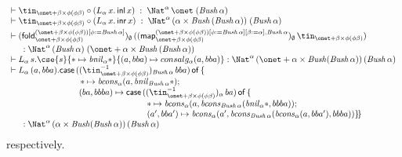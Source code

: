 \documentclass{lmcs}
\theoremstyle{plain}\newtheorem{satz}[thm]{Satz}
\newcommand{\inl}{\mathsf{inl}}
\newcommand{\inr}{\mathsf{inr}}
\newcommand{\fold}{\mathsf{fold}}
\newcommand{\ininv}[2]{(\tin^{-1}_{\onet +
  \beta \times \phi (\phi\beta)})_{#1}\, #2}
\newcommand{\map}{\mathsf{map}}
\begin{document}
\[\begin{array}{l}
\vdash \tin_{\onet + \beta \times \phi (\phi\beta)} \circ (
L_{\alpha}\, x.\, \inl\, x) \; : \; \Nat^{\alpha}\, \onet\;
(\mathit{Bush}\,\alpha)\\ 
\vdash \tin_{\onet + \beta \times \phi (\phi\beta)} \circ (
L_{\alpha}\, x.\, \inr\, x ) \; : \; \Nat^{\alpha}\, (\alpha \times
\mathit{Bush}\,(\mathit{Bush}\,\alpha))\; (\mathit{Bush}\,\alpha)\\[0.05in]
\vdash (\fold_{\onet + \beta \times \phi (\phi\beta)}^{(\onet + \beta
  \times \phi (\phi\beta))[\phi := \mathit{Bush}\,\alpha]})_\emptyset\,
((\map_{\onet + \beta \times \phi (\phi\beta)}^{(\onet + \beta \times
  \phi (\phi\beta))[\phi := \mathit{Bush}\,\alpha][\beta := \alpha],
  \mathit{Bush}\,\alpha})_\emptyset\, \tin_{\onet + \beta \times \phi
  (\phi\beta)})\\[0.05in]
\hspace*{0.2in} : \Nat^{\alpha}\, (\mathit{Bush}\,\alpha)\; (\onet +
\alpha \times \mathit{Bush}\,(\mathit{Bush}\,\alpha))\\ 
  \vdash L_{\alpha} \, s. 
  \cse{s}{* \mapsto \mathit{bnil}_\alpha *}{(a, bba) \mapsto consalg_\alpha (a, bba)}
  : \Nat^\alpha \, (\onet + \alpha \times \mathit{Bush} (\mathit{Bush} \,\alpha)) \, (\mathit{Bush}\,\alpha) \\
  \vdash L_{\alpha} \, (a, bba).  
  \mathsf{case}\, (\ininv{\mathit{Bush}\,\alpha}{bba})\, \mathsf{of}\,\{
  \\
  \hspace{8em}\, * \mapsto \mathit{bcons}_{\alpha} (a,\mathit{bnil}_{\mathit{Bush}\,\alpha} *);  \\
  \hspace{8em} (ba, bbba) \mapsto \mathsf{case}\, (\ininv{\alpha}{ba})
  \, \mathsf{of}\,\{  \\ 
  \hspace{16em}* \mapsto \mathit{bcons}_\alpha (a, \mathit{bcons}_{\mathit{Bush}\,\alpha} 
        (\mathit{bnil}_\alpha *, bbba)) ;  \\ 
  \hspace{16em}(a', bba') \mapsto \mathit{bcons}_\alpha (a', \mathit{bcons}_{\mathit{Bush}\,\alpha}
  (\mathit{bcons}_\alpha (a, bba'), bbba)) \} \! \}\\    
\hspace*{0.2in} : \Nat^\alpha \, (\alpha \times \mathit{Bush} (\mathit{Bush} \,\alpha)) \, (\mathit{Bush}\,\alpha) \\
\end{array}\]
respectively. 
\end{document}
